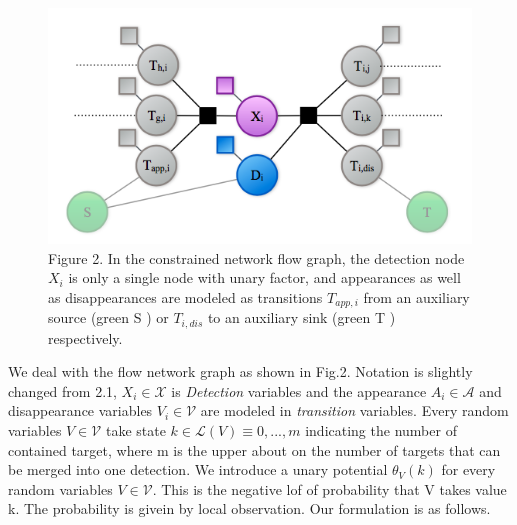 \documentclass[10pt,twocolumn,letterpaper]{article}
\begin{document}
\begin{figure}[t]
\begin{center}
\centering\includegraphics[width=0.8\linewidth]{model2.jpeg}
\end{center}
   \caption{Figure 2. In the constrained network flow graph, the detection node \(X_{i}\) is only a single node with unary factor, and appearances as well as disappearances are modeled as transitions \(T_{app,i}\) from an auxiliary source (green S ) or \(T_{i,dis}\) to an auxiliary sink (green T ) respectively.}
\end{figure}

We deal with the flow network graph as shown in Fig.2. Notation is slightly changed from 2.1, $X_i \in \mathcal{X}$ is \textit{Detection} variables and the appearance $A_i \in \mathcal{A}$ and disappearance variables $V_i \in \mathcal{V}$ are modeled in \textit{transition} variables. Every random variables $V \in \mathcal{V}$ take state $k \in \mathcal{L}(V) \equiv {0, ...,m}$ indicating the number of contained target, where m is the upper about on the number of targets that can be merged into one detection. We introduce a unary potential $\theta_{V}(k)$ for every random variables $V \in \mathcal{V}$. This is the negative lof of probability that V takes value k. The probability is givein by local observation.
Our formulation is as follows.
\end{document}

